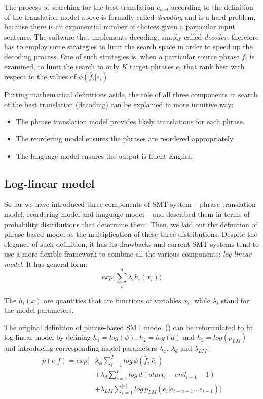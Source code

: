 The process of searching for the best translation $e_{best}$ according to the definition of
the translation model above is formally called \emph{decoding} and is a hard problem,
because there is an exponential number of choices given a particular input sentence.
The software that implements decoding, simply called \emph{decoder}, therefore has to employ
some strategies to limit the search space in order to speed up the decoding process.
One of such strategies is, when a particular source phrase $\bar{f}_i$ is examined,
to limit the search to only $K$ target phrases $\bar{e}_i$ that rank best
with respect to the values of $\phi(\bar{f}_i|\bar{e}_i)$.

Putting mathematical definitions aside, the role of all three components in search of
the best translation (decoding) can be explained in more intuitive way:
\begin{itemize}
  \item The phrase translation model provides likely translations for each phrase.
  \item The reordering model ensures the phrases are reordered appropriately.
  \item The language model ensures the output is fluent English.
\end{itemize}

\subsection{Log-linear model}

So far we have introduced three components of SMT system -- phrase translation model,
reordering model and language model -- and described them in terms of probability
distributions that determine them.
Then, we laid out the definition of phrase-based model as the multiplication of these
three distributions.
Despite the elegance of such definition, it has its drawbacks and current SMT
systems tend to use a more flexible framework to combine all the various
components: \emph{log-linear model}.
It has general form:
\begin{equation}
  exp \Big( \sum_i^n \lambda_i h_i(x_i) \Big)
\end{equation}

The $h_i(x)$ are quantities that are functions of variables $x_i$,
while $\lambda_i$ stand for the model parameters.

The original definition of phrase-based SMT model () can be reformulated to
fit log-linear model by defining $h_1 = log(\phi)$, $h_2 = log(d)$ and $h_3 = log(p_{LM})$
and introducing corresponding model parameters $\lambda_{\phi}$, $\lambda_{d}$ and $\lambda_{LM}$:
\begin{equation}
  \begin{aligned}
  p(e|f) = exp \Bigg[ &\lambda_{\phi} \sum_{i=1}^I log \, \phi(\bar{f}_i|\bar{e}_i) \\
       &+ \lambda_{d} \sum_{i=1}^{I} log \, d(start_i - end_{i-1} - 1) \\
       &+ \lambda_{LM} \sum_{i=1}^{|e|} log \, p_{LM}(e_i|e_{i-n+1}...e_{i-1}) \Bigg] \\
  \end{aligned}
\end{equation}

